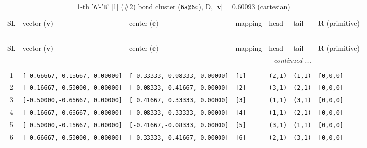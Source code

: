 \documentclass[fleqn,10pt,landscape]{jsarticle}
\begin{document}
\begin{longtable}[l]{cllllll}
\captionsetup{justification=raggedright, singlelinecheck=off}
\caption{1-th '\texttt{A}'-'\texttt{B}' [1] (\#2) bond cluster (\texttt{6a@6c}), D, $|\bm{v}|=0.60093$ (cartesian)}
 \\
 \hline \hline
SL & vector ($\bm{v})$ & center ($\bm{c})$ & mapping & head & tail & $\bm{R}$ (primitive) \\ \hline \endfirsthead

\multicolumn{6}{l}{\tablename\ \thetable{}} \\
 \hline \hline
SL & vector ($\bm{v})$ & center ($\bm{c})$ & mapping & head & tail & $\bm{R}$ (primitive) \\ \hline \endhead

 \hline \hline
\multicolumn{6}{r}{\footnotesize\it continued ...} \\ \endfoot

 \hline \hline
\multicolumn{6}{r}{} \\ \endlastfoot

1 & \texttt{[ 0.66667, 0.16667, 0.00000]} & \texttt{[-0.33333, 0.08333, 0.00000]} & \texttt{[1]} & \texttt{(2,1)} & \texttt{(1,1)} & \texttt{[0,0,0]} \\ \hline
2 & \texttt{[-0.16667, 0.50000, 0.00000]} & \texttt{[-0.08333,-0.41667, 0.00000]} & \texttt{[2]} & \texttt{(3,1)} & \texttt{(2,1)} & \texttt{[0,0,0]} \\ \hline
3 & \texttt{[-0.50000,-0.66667, 0.00000]} & \texttt{[ 0.41667, 0.33333, 0.00000]} & \texttt{[3]} & \texttt{(1,1)} & \texttt{(3,1)} & \texttt{[0,0,0]} \\ \hline
4 & \texttt{[ 0.16667, 0.66667, 0.00000]} & \texttt{[ 0.08333,-0.33333, 0.00000]} & \texttt{[4]} & \texttt{(1,1)} & \texttt{(2,1)} & \texttt{[0,0,0]} \\ \hline
5 & \texttt{[ 0.50000,-0.16667, 0.00000]} & \texttt{[-0.41667,-0.08333, 0.00000]} & \texttt{[5]} & \texttt{(3,1)} & \texttt{(1,1)} & \texttt{[0,0,0]} \\ \hline
6 & \texttt{[-0.66667,-0.50000, 0.00000]} & \texttt{[ 0.33333, 0.41667, 0.00000]} & \texttt{[6]} & \texttt{(2,1)} & \texttt{(3,1)} & \texttt{[0,0,0]} \\
\end{longtable}
\end{document}
